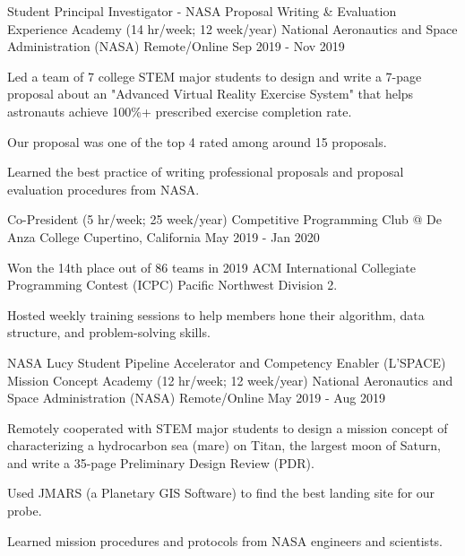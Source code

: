 \begin{cventries}
  \cventry
    {Student Principal Investigator - NASA Proposal Writing \& Evaluation Experience Academy  (14 hr/week; 12 week/year)} %
    {National Aeronautics and Space Administration (NASA)} %
    {Remote/Online} %
    {Sep 2019 - Nov 2019} %
    {
	\begin{cvitems} %
      	\item Led a team of 7 college STEM major students to design and write a 7-page proposal about an "Advanced Virtual Reality Exercise System" that helps astronauts achieve 100\%+ prescribed exercise completion rate. 
      	\item Our proposal was one of the top 4 rated among around 15 proposals.
      	\item Learned the best practice of writing professional proposals and proposal evaluation procedures from NASA.
	\end{cvitems}
    }
    
  \cventry
    {Co-President (5 hr/week; 25 week/year)} %
    {Competitive Programming Club @ De Anza College} %
    {Cupertino, California} %
    {May 2019 - Jan 2020} %
    {
	\begin{cvitems} %
      	\item Won the 14th place out of 86 teams in 2019 ACM International Collegiate Programming Contest (ICPC) Pacific Northwest Division 2. 
      	\item Hosted weekly training sessions to help members hone their algorithm, data structure, and problem-solving skills. 
	\end{cvitems}
    }    
    
    \cventry
    {NASA Lucy Student Pipeline Accelerator and Competency Enabler (L'SPACE) Mission Concept Academy (12 hr/week; 12 week/year)} %
    {National Aeronautics and Space Administration (NASA)} %
    {Remote/Online} %
    {May 2019 - Aug 2019} %
    {
	\begin{cvitems} %
      	\item Remotely cooperated with STEM major students to design a mission concept of characterizing a hydrocarbon sea (mare) on Titan, the largest moon of Saturn, and write a 35-page Preliminary Design Review (PDR). 
      	\item Used JMARS (a Planetary GIS Software) to find the best landing site for our probe.
      	\item Learned mission procedures and protocols from NASA engineers and scientists. 
	\end{cvitems}
    }  
    

\end{cventries}
